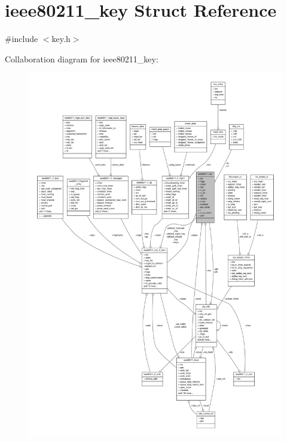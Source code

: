 \hypertarget{structieee80211__key}{\section{ieee80211\-\_\-key Struct Reference}
\label{structieee80211__key}
}


{\ttfamily \#include $<$key.\-h$>$}



Collaboration diagram for ieee80211\-\_\-key\-:
\nopagebreak
\begin{figure}[H]
\begin{center}
\leavevmode
\includegraphics[width=350pt]{structieee80211__key__coll__graph}
\end{center}
\end{figure}
